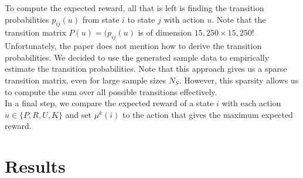\documentclass[11pt, oneside]{article}   	%
\begin{document}
To compute the expected reward, all that is left is finding the transition probabilities $p_{ij}(u)$ from state $i$ to state $j$ with action $u$. Note that the transition matrix $P(u) = (p_{ij}(u)$ is of dimension $15,250 \times 15,250$! Unfortunately, the paper does not mention how to derive the transition probabilities. We decided to use the generated sample data to empirically estimate the transition probabilities. Note that this approach gives us a sparse transition matrix, even for large sample sizes $N_S$. However, this sparsity allows us to compute the sum over all possible transitions effectively. \\

In a final step, we compare the expected reward of a state $i$ with each action $u \in \{P, R, U, K\}$ and set $\mu^k(i)$ to the action that gives the maximum expected reward.

\section{Results}
\end{document}
